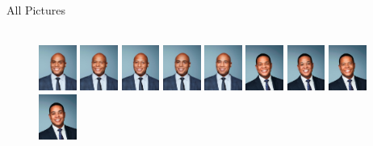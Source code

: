\documentclass[10pt]{beamer}
\begin{document}
{\begin{frame}{All Pictures}
\begin{adjustwidth}
\begin{figure}[h!]
\\ 
\centering
\includegraphics[width=0.11\textwidth]{img/pic/brunhuber-BM-011.jpg}\hfill
\includegraphics[width=0.11\textwidth]{img/pic/brunhuber-BM-033.jpg}\hfill
\includegraphics[width=0.11\textwidth]{img/pic/brunhuber-BM-214.jpg}\hfill
\includegraphics[width=0.11\textwidth]{img/pic/brunhuber-BM-204.jpg}\hfill
\includegraphics[width=0.11\textwidth]{img/pic/brunhuber-BM-212.jpg}\hfill
\includegraphics[width=0.11\textwidth]{img/pic/lemon-BM-017.jpg}\hfill
\includegraphics[width=0.11\textwidth]{img/pic/lemon-BM-225.jpg}\hfill
\includegraphics[width=0.11\textwidth]{img/pic/lemon-BM-033.jpg}\hfill
\includegraphics[width=0.11\textwidth]{img/pic/lemon-BM-024.jpg}\hfill

\end{figure}
\end{adjustwidth}
\end{frame}}
\end{document}
